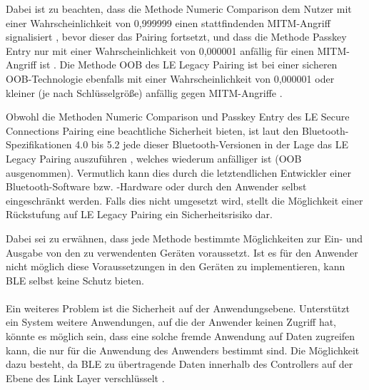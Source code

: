 Dabei ist zu beachten, dass die Methode Numeric Comparison dem Nutzer mit einer Wahrscheinlichkeit von 0,999999 einen stattfindenden MITM-Angriff signalisiert \cite{BtSpec4.2_2309}, bevor dieser das Pairing fortsetzt, und dass die Methode Passkey Entry nur mit einer Wahrscheinlichkeit von 0,000001 anfällig für einen MITM-Angriff ist \cite{BtSpec4.2_2304} \cite{BtSpec4.2_2311}. Die Methode OOB des LE Legacy Pairing ist bei einer sicheren OOB-Technologie ebenfalls mit einer Wahrscheinlichkeit von 0,000001 oder kleiner (je nach Schlüsselgröße) anfällig gegen MITM-Angriffe \cite{BtSpec4.2_2305}.

Obwohl die Methoden Numeric Comparison und Passkey Entry des LE Secure Connections Pairing eine beachtliche Sicherheit bieten, ist laut den Bluetooth-Spezifikationen 4.0 bis 5.2 jede dieser Bluetooth-Versionen in der Lage das LE Legacy Pairing auszuführen \cite{BtSpec4.2_248_b} \cite{BtSpec5.2_277}, welches wiederum anfälliger ist (OOB ausgenommen). 
Vermutlich kann dies durch die letztendlichen Entwickler einer Bluetooth-Software bzw. -Hardware oder durch den Anwender selbst eingeschränkt werden. Falls dies nicht umgesetzt wird, stellt die Möglichkeit einer Rückstufung auf LE Legacy Pairing ein Sicherheitsrisiko dar.

Dabei sei zu erwähnen, dass jede Methode bestimmte Möglichkeiten zur Ein- und Ausgabe von den zu verwendenten Geräten voraussetzt. Ist es für den Anwender nicht möglich diese Voraussetzungen in den Geräten zu implementieren, kann BLE selbst keine Schutz bieten.
\\\\
Ein weiteres Problem ist die Sicherheit auf der Anwendungsebene. Unterstützt ein System weitere Anwendungen, auf die der Anwender keinen Zugriff hat, könnte es möglich sein, dass eine solche fremde Anwendung auf Daten zugreifen kann, die nur für die Anwendung des Anwenders bestimmt sind. Die Möglichkeit dazu besteht, da BLE zu übertragende Daten innerhalb des Controllers auf der Ebene des Link Layer verschlüsselt \cite{BtSpec4.0_196} \cite{BtSpec4.0_2285}. 


